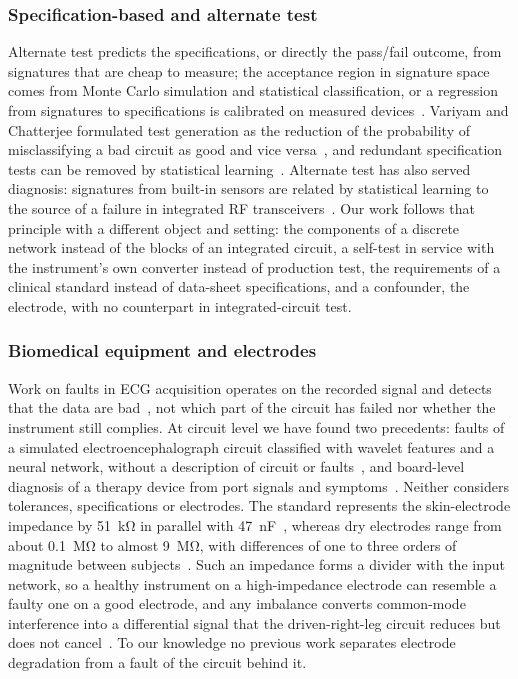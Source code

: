 \subsubsection*{Specification-based and alternate test}
Alternate test predicts the specifications, or directly the pass/fail outcome, from signatures
that are cheap to measure; the acceptance region in signature space comes from Monte Carlo
simulation and statistical classification, or a regression from signatures to specifications is
calibrated on measured devices~\cite{cheng2010,voorakaranam2007}. Variyam and Chatterjee
formulated test generation as the reduction of the probability of misclassifying a bad circuit as
good and vice versa~\cite{variyam1998spec,variyam1998synth}, and redundant specification tests
can be removed by statistical learning~\cite{biswas2005}. Alternate test has also served
diagnosis: signatures from built-in sensors are related by statistical learning to the source of
a failure in integrated RF transceivers~\cite{cheng2010}. Our work follows that principle with a
different object and setting: the components of a discrete network instead of the blocks of an
integrated circuit, a self-test in service with the instrument's own converter instead of
production test, the requirements of a clinical standard instead of data-sheet specifications,
and a confounder, the electrode, with no counterpart in integrated-circuit test.

\subsubsection*{Biomedical equipment and electrodes}
Work on faults in ECG acquisition operates on the recorded signal and detects that the data are
bad~\cite{agarwal2022,khezripour2026,adams2026}, not which part of the circuit has failed nor
whether the instrument still complies. At circuit level we have found two precedents: faults of a
simulated electroencephalograph circuit classified with wavelet features and a neural network,
without a description of circuit or faults~\cite{gao2025}, and board-level diagnosis of a therapy
device from port signals and symptoms~\cite{liu2021}. Neither considers tolerances,
specifications or electrodes. The standard represents the skin-electrode impedance by
\SI{51}{\kilo\ohm} in parallel with \SI{47}{\nano\farad}~\cite{iec60601225}, whereas dry
electrodes range from about \SI{0.1}{\mega\ohm} to almost \SI{9}{\mega\ohm}, with differences of
one to three orders of magnitude between subjects~\cite{joutsen2024}. Such an impedance forms a
divider with the input network, so a healthy instrument on a high-impedance electrode can
resemble a faulty one on a good electrode, and any imbalance converts common-mode interference
into a differential signal that the driven-right-leg circuit reduces but does not
cancel~\cite{winter1983}. To our knowledge no previous work separates electrode degradation from
a fault of the circuit behind it.
